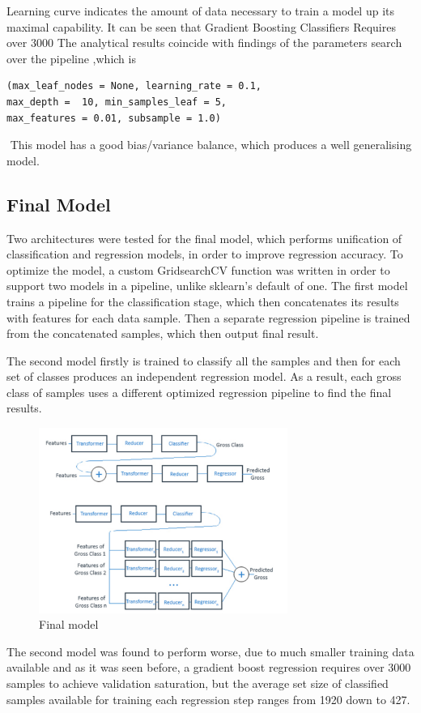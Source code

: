 Learning curve indicates the amount of data necessary to train a model up its maximal capability. It can be seen that Gradient Boosting Classifiers Requires over 3000
The analytical results coincide with findings of the parameters search over the pipeline ,which is \begin{verbatim}(max_leaf_nodes = None, learning_rate = 0.1,
max_depth =  10, min_samples_leaf = 5, 
max_features = 0.01, subsample = 1.0) \end{verbatim}­ This model has a good bias/variance balance, which produces a well generalising model.

\subsection{Final Model}
Two architectures were tested for the final model, which performs unification of classification and regression models, in order to improve regression accuracy. To optimize the model, a custom GridsearchCV function was written in order to support two models in a pipeline, unlike sklearn’s default of one. The first model trains a pipeline for the classification stage, which then concatenates its results with features for each data sample. Then a separate regression pipeline is trained from the concatenated samples, which then output final result.


The second model firstly is trained to classify all the samples and then for each set of classes produces an independent regression model. As a result, each gross class of samples uses a different optimized regression pipeline to find the final results.


\begin{figure}[h]
\centering
\includegraphics[width=3.2in]{figures/final_model}
\caption{Final model}
\label{fig:finalmodel}
\end{figure}

The second model was found to perform worse, due to much smaller training data available and as it was seen before, a gradient boost regression requires over 3000 samples to achieve validation saturation, but the average set size of classified samples available for training each regression step  ranges from 1920 down to 427.


